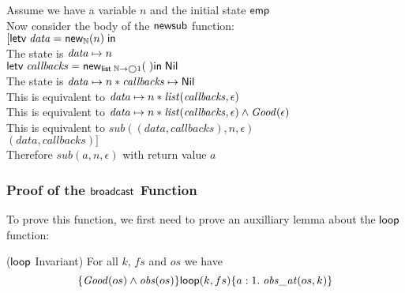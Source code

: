 \begin{tabbedproof}
\oo Assume we have a variable $n$ and the initial state $\mathsf{emp}$\\
\ooo Now consider the body of the $\mathsf{newsub}$ function: \\
\ooo $[\mathsf{letv}\;\mathit{data} = \mathsf{new}_{\mathbb{N}}(n)\;\mathsf{in}\;$ \\
\ooo The state is $\mathit{data} \mapsto n$ \\
\ooo $\mathsf{letv}\;\mathit{callbacks} = \mathsf{new}_{\mathsf{list}\;{\mathbb{N}\to\bigcirc{1}}}(\;)\mathsf{in}\;\mathsf{Nil}{}$ \\
\ooo The state is $\mathit{data} \mapsto n * \mathit{callbacks} \mapsto \mathsf{Nil}$ \\
\ooo This is equivalent to $\mathit{data} \mapsto n * \mathit{list}(\mathit{callbacks}, \epsilon)$ \\
\ooo This is equivalent to $\mathit{data} \mapsto n * \mathit{list}(\mathit{callbacks}, \epsilon) \land \mathit{Good}(\epsilon)$ \\
\ooo This is equivalent to $\mathit{sub}(\mathit{(data,callbacks)}, n, \epsilon)$ \\
\ooo $(data, callbacks)]$ \\
\ooo Therefore $\mathit{sub}(a, n, \epsilon)$ with return value $a$ \\
\end{tabbedproof}

\subsubsection{Proof of the $\mathsf{broadcast}$ Function}

To prove this function, we first need to prove an auxilliary lemma about the $\mathsf{loop}$ function:

\begin{lemma}{($\mathsf{loop}$ Invariant)}
For all $k$, $fs$  and $os$ we have
\begin{displaymath}
\{{\mathit{Good}(os) \land \mathit{obs}(os)}\}{\mathsf{loop}(k, fs)}\{{a:1}.\;{\mathit{obs\_at}(os, k)}\}
\end{displaymath}
\end{lemma}

